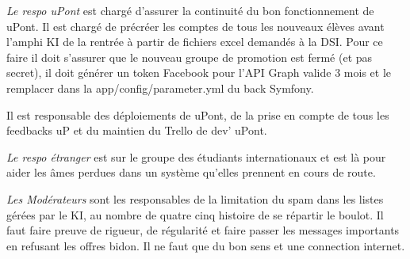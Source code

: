 \documentclass{ki019}
\begin{document}

\emph{Le respo uPont} est chargé d’assurer la continuité du bon fonctionnement de uPont. Il est chargé de précréer les comptes de tous les nouveaux élèves avant l’amphi KI de la rentrée à partir de fichiers excel demandés à la DSI. Pour ce faire il doit s’assurer que le nouveau groupe de promotion est fermé (et pas secret), il doit générer un token Facebook pour l’API Graph valide 3 mois et le remplacer dans la app/config/parameter.yml du back Symfony.

Il est responsable des déploiements de uPont, de la prise en compte de tous les feedbacks uP et du maintien du Trello de dev’ uPont.


\emph{Le respo étranger} est sur le groupe des étudiants internationaux et est là pour aider les âmes perdues dans un système qu’elles prennent en cours de route.


\emph{Les Modérateurs} sont les responsables de la limitation du spam dans les listes gérées par le KI, au nombre de quatre cinq histoire de se répartir le boulot. Il faut faire preuve de rigueur, de régularité et faire passer les messages importants en refusant les offres bidon. Il ne faut que du bon sens et une connection internet.

\Footer{\today}
\end{document}
